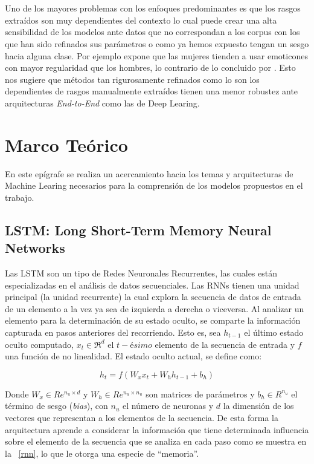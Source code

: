 \\\\
Uno de los mayores problemas con los enfoques predominantes es que los rasgos extraídos son muy dependientes del contexto lo cual puede crear una alta sensibilidad de los modelos ante datos que no correspondan a los corpus con los que han sido refinados sus parámetros o como ya hemos expuesto tengan un sesgo hacia alguna clase. Por ejemplo \citep{Newman2008GenderDI} expone que las mujeres tienden a usar emoticones con mayor regularidad que los hombres, lo contrario de lo concluido por \citep{Schwartz2013PersonalityGA}. Esto nos sugiere que métodos tan rigurosamente refinados como lo son los dependientes de rasgos manualmente extraídos tienen una menor robustez ante arquitecturas \textit{End-to-End} como las de Deep Learing.

\section{Marco Teórico}

En este epígrafe se realiza un acercamiento hacia los temas y arquitecturas de Machine Learing necesarios para la comprensión de los modelos propuestos en el trabajo.

\subsection{LSTM: Long Short-Term Memory Neural Networks}

	Las LSTM son un tipo de Redes Neuronales Recurrentes, las cuales están especializadas en el análisis de datos secuenciales. 
	Las RNNs tienen una unidad principal (la unidad recurrente) la cual explora la secuencia de datos de entrada de un elemento a la vez ya sea de izquierda a derecha o viceversa. Al analizar un elemento para la determinación de su estado oculto, se comparte la información capturada en pasos anteriores del recorriendo. Esto es, sea $h_{t-1}$ el último estado oculto computado, $x_t \in \Re^d$ el $t-ésimo$ elemento de la secuencia de entrada y $f$ una función de no linealidad. El estado oculto actual, se define como:
	
	\begin{equation}
		h_t = f(W_xx_t + W_hh_{t-1} + b_h)
		\label{rrn_form}
	\end{equation}

	Donde $W_x \in Re^{n_u\times d}$ y $W_h \in Re^{n_u\times n_u}$ son matrices de parámetros y $b_h \in R^{n_u}$ el término de sesgo (\textit{bias}), con $n_u$ el número de neuronas y $d$ la dimensión de los vectores que representan a los elementos de la secuencia.
	De esta forma la arquitectura aprende a considerar la información que tiene determinada influencia sobre el elemento de la secuencia que se analiza en cada paso como se muestra en la \figurename~\ref{rnn}, lo que le otorga una especie de ``memoria''.
	
